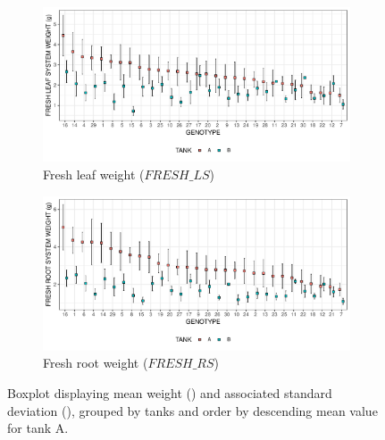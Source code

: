 \begin{figure}\ContinuedFloat
	\captionsetup[figure]{list=no}
	\begin{subfigure}[t]{\textwidth}
		\centering
		\includegraphics[width = \textwidth]{../../Figures/FRESH_LS_summary_plot.pdf}
		\caption{Fresh leaf weight ($FRESH\_LS$)}
	\end{subfigure}

	\begin{subfigure}[t]{\textwidth}
		\centering
		\includegraphics[width = \textwidth]{../../Figures/FRESH_RS_summary_plot.pdf}
		\caption{Fresh root weight ($FRESH\_RS$)}
	\end{subfigure}
	\caption[Boxplot of the mean weight and associated standard deviation]{Boxplot displaying mean weight (\protect\emptysquare) and associated standard deviation (\protect\blackline), grouped by tanks and order by descending mean value for tank A.}
	\label{fig:dotplot_all_variables}
\end{figure}

